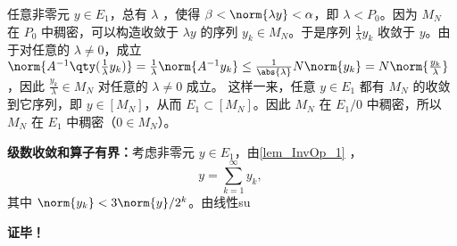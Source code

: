 任意非零元 $y\in E_1$，总有 $\lambda$ ，使得 $\beta<\norm{\lambda y}<\alpha$，即 $\lambda<P_0$。因为 $M_N$ 在 $P_0$ 中稠密，可以构造收敛于 $\lambda y$ 的序列 $y_k\in M_N$。于是序列 $\frac{1}{\lambda}y_k$ 收敛于 $y$。由于对任意的 $\lambda\neq0$，成立 $\norm{A^{-1}\qty(\frac{1}{\lambda}y_k)}=\frac{1}{\lambda}\norm{A^{-1}y_k}\leq\frac{1}{\abs{\lambda}}N\norm{y_k}=N\norm{\frac{y_k}{\lambda}}$，因此 $\frac{y_k}{\lambda}\in M_N$ 对任意的 $\lambda\neq0$ 成立。
这样一来，任意 $y\in E_1$ 都有 $M_N$ 的收敛到它序列，即 $y\in[M_N]$，从而 $E_1\subset [M_N]$。因此 $M_N$ 在 $E_1/0$ 中稠密，所以 $M_N$ 在 $E_1$ 中稠密（$0\in M_N$）。

\textbf{级数收敛和算子有界：}考虑非零元 $y\in E_1$，由\autoref{lem_InvOp_1} ，
\begin{equation}
y=\sum_{k=1}^\infty y_k,~
\end{equation}
其中 $\norm{y_k}<3\norm{y}/2^k$。由线性su




\textbf{证毕！}



